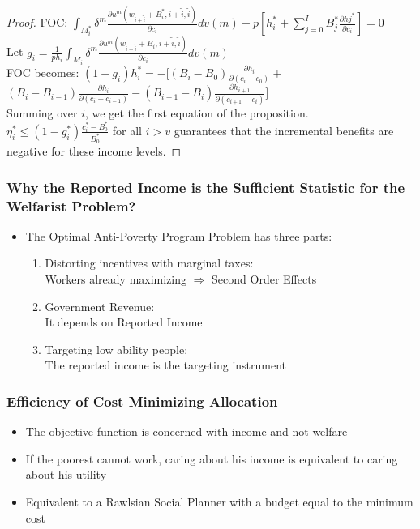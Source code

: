 \documentclass[xcolor=pdftex,dvipsnames,table]{beamer}
\begin{document}
\begin{frame}[label=proof_welfare]
\begin{proof}
FOC: $\int_{M^*_i}\delta^m \frac{\partial u^m(w_{i+\tilde{i}}+B^*_i,i+\tilde{i},\tilde{i})}{\partial c_i}dv(m)-p\left[h_i^*+\sum_{j=0}^IB_j^*\frac{\partial hj^*}{\partial c_i}\right]=0$ \\
Let $g_i=\frac{1}{p h_i}\int_{M_i} \delta^m \frac{\partial u^m(w_{i+\tilde{i}}+B_i,i+\tilde{i},\tilde{i})}{\partial c_i} dv(m)$\\
FOC becomes: $(1-g_i)h_i^*=-\Big[(B_i-B_0)\frac{\partial h_i}{\partial (c_i-c_0)}+$\\
$(B_i-B_{i-1})\frac{\partial h_i}{\partial(c_i-c_{i-1})}-(B_{i+1}-B_{i})\frac{\partial h_{i+1}}{\partial(c_{i+1}-c_{i})}\Big]$\\
Summing over $i$, we get the first equation of the proposition.\\
$\eta^{*}_i\leq (1-g^*_i)\frac{c^*_i-B_0^*}{B_0^*}$ for all $i>v$ guarantees that the incremental benefits are negative for these income levels.
\end{proof}
\end{frame}

\begin{frame}[label=sufficient_wel]
\frametitle{Why the Reported Income is the Sufficient Statistic  for the Welfarist Problem?}
\begin{itemize}
\item The Optimal Anti-Poverty Program Problem has three parts: 

\begin{enumerate}
\item Distorting incentives with marginal taxes: \\
Workers already maximizing 
$\Rightarrow$ Second Order Effects

\item Government Revenue: \\
It depends on Reported Income
\item Targeting low ability people: \\
The reported income is the targeting instrument
\end{enumerate}
\end{itemize}
\hyperlink{prop_imp}{}
\end{frame}

\begin{frame}[label=efficiency]
	\frametitle{Efficiency of Cost Minimizing Allocation}
\begin{itemize}
\item The objective function is concerned with income and not welfare  
\pause
\item If the poorest cannot work, caring about his income is equivalent to caring about his utility
\pause
\item Equivalent to a Rawlsian Social Planner with a budget equal to the minimum cost
\end{itemize}
\end{frame}
\end{document}
